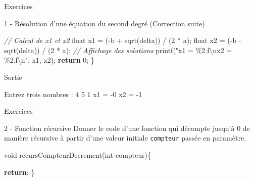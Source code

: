 \documentclass[
  10pt,
  french,
  ignorenonframetext,
  aspectratio=169,
]{beamer}
\newenvironment{Shaded}{}{}
\newcommand{\AttributeTok}[1]{\textcolor[rgb]{0.49,0.56,0.16}{#1}}
\newcommand{\CommentTok}[1]{\textcolor[rgb]{0.38,0.63,0.69}{\textit{#1}}}
\newcommand{\ControlFlowTok}[1]{\textcolor[rgb]{0.00,0.44,0.13}{\textbf{#1}}}
\newcommand{\DataTypeTok}[1]{\textcolor[rgb]{0.56,0.13,0.00}{#1}}
\newcommand{\DecValTok}[1]{\textcolor[rgb]{0.25,0.63,0.44}{#1}}
\newcommand{\ExtensionTok}[1]{#1}
\newcommand{\NormalTok}[1]{#1}
\newcommand{\OperatorTok}[1]{\textcolor[rgb]{0.40,0.40,0.40}{#1}}
\newcommand{\SpecialCharTok}[1]{\textcolor[rgb]{0.25,0.44,0.63}{#1}}
\newcommand{\StringTok}[1]{\textcolor[rgb]{0.25,0.44,0.63}{#1}}
\begin{document}
\begin{frame}[fragile]{Exercices}
\protect\hypertarget{exercices-2}{}
\begin{block}{1 - Résolution d'une équation du second degré (Correction
suite)}
\protect\hypertarget{ruxe9solution-dune-uxe9quation-du-second-degruxe9-correction-suite}{}
\begin{Shaded}
\begin{Highlighting}[]
    \CommentTok{// Calcul de x1 et x2}
    \DataTypeTok{float}\NormalTok{ x1 }\OperatorTok{=} \OperatorTok{({-}}\NormalTok{b }\OperatorTok{+}\NormalTok{ sqrt}\OperatorTok{(}\NormalTok{delta}\OperatorTok{))} \OperatorTok{/} \OperatorTok{(}\DecValTok{2} \OperatorTok{*}\NormalTok{ a}\OperatorTok{);}
    \DataTypeTok{float}\NormalTok{ x2 }\OperatorTok{=} \OperatorTok{({-}}\NormalTok{b }\OperatorTok{{-}}\NormalTok{ sqrt}\OperatorTok{(}\NormalTok{delta}\OperatorTok{))} \OperatorTok{/} \OperatorTok{(}\DecValTok{2} \OperatorTok{*}\NormalTok{ a}\OperatorTok{);}
    \CommentTok{// Affichage des solutions}
\NormalTok{    printf}\OperatorTok{(}\StringTok{"x1 = \%2.f}\SpecialCharTok{\textbackslash{}n}\StringTok{x2 = \%2.f}\SpecialCharTok{\textbackslash{}n}\StringTok{"}\OperatorTok{,}\NormalTok{ x1}\OperatorTok{,}\NormalTok{ x2}\OperatorTok{);}
    \ControlFlowTok{return} \DecValTok{0}\OperatorTok{;}
\OperatorTok{\}}
\end{Highlighting}
\end{Shaded}

\begin{block}{Sortie}
\protect\hypertarget{sortie}{}
\begin{Shaded}
\begin{Highlighting}[]
\ExtensionTok{Entrez}\NormalTok{ trois nombres : 4 5 1}
\ExtensionTok{x1}\NormalTok{ = }\AttributeTok{{-}0}
\ExtensionTok{x2}\NormalTok{ = }\AttributeTok{{-}1}
\end{Highlighting}
\end{Shaded}
\end{block}
\end{block}
\end{frame}

\begin{frame}[fragile]{Exercices}
\protect\hypertarget{exercices-3}{}
\begin{block}{2 - Fonction récursive}
\protect\hypertarget{fonction-ruxe9cursive}{}
Donner le code d'une fonction qui décompte jusqu'à 0 de manière
récursive à partir d'une valeur initiale \texttt{compteur} passée en
paramètre.

\begin{Shaded}
\begin{Highlighting}[]
\DataTypeTok{void}\NormalTok{ recursCompteurDecrement}\OperatorTok{(}\DataTypeTok{int}\NormalTok{ compteur}\OperatorTok{)\{}

    \ControlFlowTok{return}\OperatorTok{;}
\OperatorTok{\}}
\end{Highlighting}
\end{Shaded}
\end{block}
\end{frame}
\end{document}
